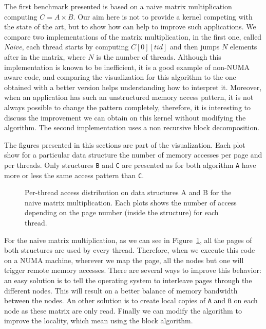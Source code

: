 The first benchmark presented is based on a naive matrix multiplication
computing $C=A \times B$. Our aim here is not to provide a kernel competing with the
state of the art, but to show how \TABARNAC can help to improve such
applications. We compare two implementations of the matrix multiplication, in
the first one, called \emph{Naive}, each thread starts by computing
$C[0][tid]$ and then jumps $N$ elements after in the matrix, where $N$ is the
number of threads. Although this implementation is known to be inefficient, it is a
good example of non-NUMA aware code, and comparing the \TABARNAC visualization
for this algorithm to the one obtained with a better version helps understanding
how to interpret it.
Moreover, when an application has such an unstructured memory access pattern, it
is not always possible to change the pattern completely, therefore, it is
interesting to discuss the improvement we can obtain on this kernel without
modifying the algorithm. The second implementation uses a non recursive block
decomposition.

The figures presented in this sections are part of the \TABARNAC visualization.
Each plot show for a particular data structure the number of memory accesses
per page and per threads. Only structures \texttt{B} and \texttt{C} are
presented as for both algorithm \texttt{A} have more or less the same access
pattern than \texttt{C}.

\begin{figure}[htb]
    \centering
    \caption{Per-thread access distribution on data structures A and B for the
        naive matrix multiplication. Each plots shows the number of access
    depending on the page number (inside the structure) for each thread.}
    \label{fig:matrix-naive}
\end{figure}

For the naive matrix multiplication, as we can see in Figure~\ref{fig:matrix-naive}, all the pages of both structures are used by every
thread. Therefore, when we execute this code on a NUMA machine, wherever we
map the page, all the nodes but one will trigger remote memory accesses. There
are several ways to improve this behavior: an easy solution
is to tell the operating system to interleave pages through the different
nodes. This will result on a better balance of memory bandwidth between the
nodes. An other solution is to create local copies of \texttt{A} and
\texttt{B} on each node as these matrix are only read. Finally we can modify
the algorithm to improve the locality, which mean using the block algorithm.

